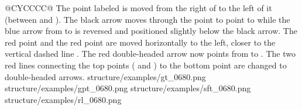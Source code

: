 \begin{table}[t]
\begin{tabularx}{\textwidth}{@{}CYCCCC@{}}
      {The point labeled  is moved from the right of  to the left of it (between  and ). The black arrow moves through the point  to point to  while the blue arrow from  to  is reversed and positioned slightly below the black arrow. The red point  and the red point  are moved horizontally to the left, closer to the vertical dashed line . The red double-headed arrow now points from  to . The two red lines connecting the top points ( and ) to the bottom point  are changed to double-headed arrows.}
      {structure/examples/gt_0680.png}
      {structure/examples/gpt_0680.png}
      {structure/examples/sft_0680.png}
      {structure/examples/rl_0680.png}
    \bottomrule
\end{tabularx}
\end{table}
